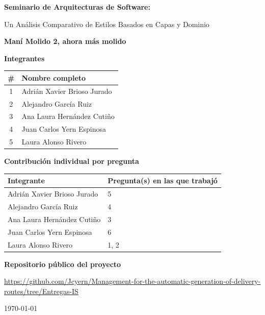 \documentclass[12pt,a4paper]{article}
\newcommand{\NombreEquipo}{Maní Molido 2, ahora más molido}
\newcommand{\IntegranteA}{Adrián Xavier Brioso Jurado}
\newcommand{\IntegranteB}{Alejandro García Ruiz}
\newcommand{\IntegranteC}{Ana Laura Hernández Cutiño}
\newcommand{\IntegranteD}{Juan Carlos Yern Espinosa}
\newcommand{\IntegranteE}{Laura Alonso Rivero}
\newcommand{\PreguntasA}{5}
\newcommand{\PreguntasB}{4}
\newcommand{\PreguntasC}{3}
\newcommand{\PreguntasD}{6}
\newcommand{\PreguntasE}{1, 2}
\newcommand{\RepoURL}{\url{https://github.com/Jcyern/Management-for-the-automatic-generation-of-delivery-routes/tree/Entregas-IS}}
\begin{document}
\begin{titlepage}
\centering

{\Large\bfseries Seminario de Arquitecturas de Software:\par}
\vspace{0.2cm}
{\large Un Análisis Comparativo de Estilos Basados en Capas y Dominio\par}

\vspace{1.8cm}

{\large\bfseries \NombreEquipo\par}

\vspace{1.6cm}

{\large\bfseries Integrantes\par}
\vspace{0.4cm}
{\small
\begin{tabular}{@{}cp{9cm}@{}}
\hline
\# & Nombre completo \\
\hline
1 & \IntegranteA \\[0.4em]
2 & \IntegranteB \\[0.4em]
3 & \IntegranteC \\[0.4em]
4 & \IntegranteD \\[0.4em]
5 & \IntegranteE \\
\hline
\end{tabular}
\par}

\vspace{1.6cm}

{\large\bfseries Contribución individual por pregunta\par}
\vspace{0.4cm}
{\small
\begin{tabular}{@{}p{6cm}p{8.5cm}@{}}
\hline
Integrante & Pregunta(s) en las que trabajó \\
\hline
\IntegranteA & \PreguntasA \\[0.4em]
\IntegranteB & \PreguntasB \\[0.4em]
\IntegranteC & \PreguntasC \\[0.4em]
\IntegranteD & \PreguntasD \\[0.4em]
\IntegranteE & \PreguntasE \\
\hline
\end{tabular}
\par}

\vspace{1.6cm}

{\large\bfseries Repositorio público del proyecto\par}
\vspace{0.4cm}
\RepoURL

\vfill
{\large \today\par}

\end{titlepage}
\end{document}
